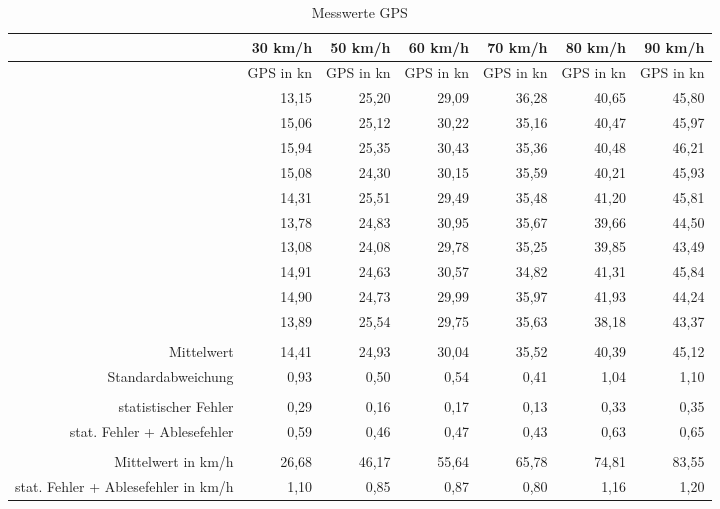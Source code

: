 \begin{table}[htbp]
  \centering
  \caption{Messwerte GPS}
    \begin{tabular}{rrrrrrr}
    \toprule
          & 30 km/h & 50 km/h & 60 km/h & 70 km/h & 80 km/h & 90 km/h \\
    \midrule
          & GPS in kn & GPS in kn & GPS in kn & GPS in kn & GPS in kn & GPS in kn \\
          & 13,15 & 25,20  & 29,09 & 36,28 & 40,65 & 45,80 \\
          & 15,06 & 25,12 & 30,22 & 35,16 & 40,47 & 45,97 \\
          & 15,94 & 25,35 & 30,43 & 35,36 & 40,48 & 46,21 \\
          & 15,08 & 24,30  & 30,15 & 35,59 & 40,21 & 45,93 \\
          & 14,31 & 25,51 & 29,49 & 35,48 & 41,20  & 45,81 \\
          & 13,78 & 24,83 & 30,95 & 35,67 & 39,66 & 44,50 \\
          & 13,08 & 24,08 & 29,78 & 35,25 & 39,85 & 43,49 \\
          & 14,91 & 24,63 & 30,57 & 34,82 & 41,31 & 45,84 \\
          & 14,90  & 24,73 & 29,99 & 35,97 & 41,93 & 44,24 \\
          & 13,89 & 25,54 & 29,75 & 35,63 & 38,18 & 43,37 \\
          &       &       &       &       &       &  \\
    Mittelwert & 14,41 & 24,93 & 30,04 & 35,52 & 40,39 & 45,12 \\
    Standardabweichung & 0,93 & 0,50 & 0,54 & 0,41 & 1,04 & 1,10 \\
          &       &       &       &       &       &  \\
    statistischer Fehler & 0,29 & 0,16 & 0,17 & 0,13 & 0,33 & 0,35 \\
    stat. Fehler + Ablesefehler & 0,59 & 0,46 & 0,47 & 0,43 & 0,63 & 0,65 \\
          &       &       &       &       &       &  \\
    Mittelwert in km/h & 26,68 & 46,17 & 55,64 & 65,78 & 74,81 & 83,55 \\
    stat. Fehler + Ablesefehler in km/h & 1,10 & 0,85 & 0,87 & 0,80 & 1,16 & 1,20 \\
    \bottomrule
    \end{tabular}%
  \label{tab:GPS}%
\end{table}%

